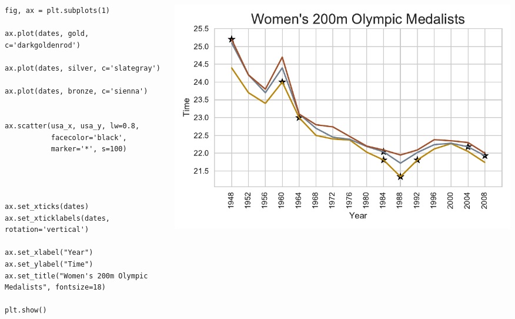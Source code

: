 \documentclass{beamer}
\begin{document}
\begin{frame}[fragile]
\tiny{
\begin{columns}
\begin{column}{0.45\textwidth}
\begin{verbatim}
fig, ax = plt.subplots(1)

ax.plot(dates, gold, c='darkgoldenrod')

ax.plot(dates, silver, c='slategray')

ax.plot(dates, bronze, c='sienna')


ax.scatter(usa_x, usa_y, lw=0.8,
           facecolor='black',
           marker='*', s=100)




ax.set_xticks(dates)
ax.set_xticklabels(dates, rotation='vertical')

ax.set_xlabel("Year")
ax.set_ylabel("Time")
ax.set_title("Women's 200m Olympic Medalists", fontsize=18)

plt.show()
\end{verbatim}
\end{column}
\begin{column}{0.55\textwidth}
\includegraphics[width=\textwidth]{../olympics_5.pdf}
\end{column}
\end{columns}
}
\end{frame}
\end{document}
